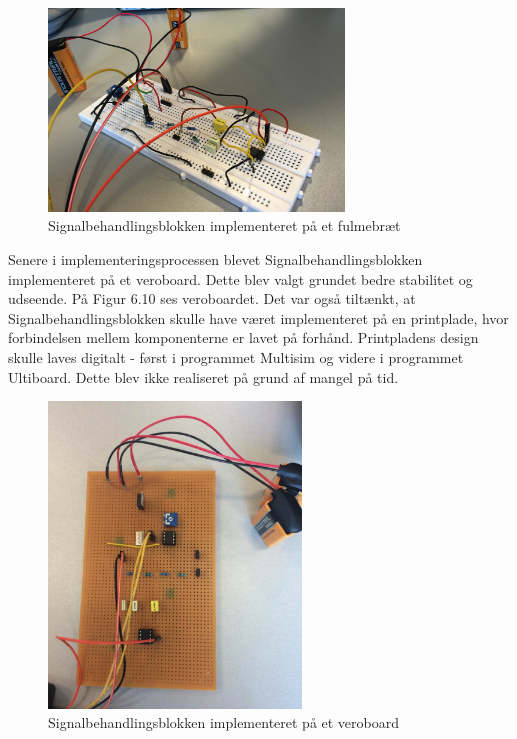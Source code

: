 \begin{figure}[H]
	\centering
	\includegraphics[width=0.7\textwidth]{Figurer/Snip20151213_83}
	\caption{Signalbehandlingsblokken implementeret på et fulmebræt}
\end{figure} 

Senere i implementeringsprocessen blevet Signalbehandlingsblokken implementeret på et veroboard. Dette blev valgt grundet bedre stabilitet og udseende. På Figur 6.10 ses veroboardet. Det var også tiltænkt, at Signalbehandlingsblokken skulle have været implementeret på en printplade, hvor forbindelsen mellem komponenterne er lavet på forhånd. Printpladens design skulle laves digitalt - først i programmet Multisim og videre i programmet Ultiboard. Dette blev ikke realiseret på grund af mangel på tid.

\begin{figure}[H]
	\centering
	\includegraphics[width=0.6\textwidth]{Figurer/Snip20151207_46}
	\caption{Signalbehandlingsblokken implementeret på et veroboard}
\end{figure}

